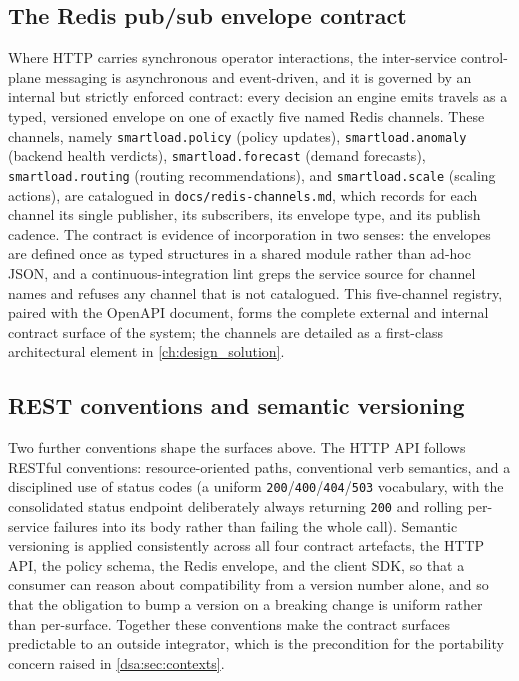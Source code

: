\subsection{The Redis pub/sub envelope contract}
\label{dsa:sec:standards-redis}

Where HTTP carries synchronous operator interactions, the inter-service control-plane
messaging is asynchronous and event-driven, and it is governed by an internal but
strictly enforced contract: every decision an engine emits travels as a typed,
versioned envelope on one of exactly five named Redis \cite{carlson2013redis}
channels. These channels, namely \texttt{smartload.policy} (policy updates),
\texttt{smartload.anomaly} (backend health verdicts), \texttt{smartload.forecast}
(demand forecasts), \texttt{smartload.routing} (routing recommendations), and
\texttt{smartload.scale} (scaling actions), are catalogued in
\texttt{docs/redis-channels.md}, which records for each channel its single publisher,
its subscribers, its envelope type, and its publish cadence. The contract is evidence
of incorporation in two senses: the envelopes are defined once as typed structures in
a shared module rather than ad-hoc JSON, and a continuous-integration lint greps the
service source for channel names and refuses any channel that is not catalogued. This
five-channel registry, paired with the OpenAPI document, forms the complete external
and internal contract surface of the system; the channels are detailed as a
first-class architectural element in \cref{ch:design_solution}.

\subsection{REST conventions and semantic versioning}
\label{dsa:sec:standards-rest}

Two further conventions shape the surfaces above. The HTTP API follows RESTful
conventions: resource-oriented paths, conventional verb semantics, and a
disciplined use of status codes (a uniform \texttt{200}/\texttt{400}/\texttt{404}/\texttt{503}
vocabulary, with the consolidated status endpoint deliberately always returning
\texttt{200} and rolling per-service failures into its body rather than failing the
whole call). Semantic versioning is applied consistently across all four contract
artefacts, the HTTP API, the policy schema, the Redis envelope, and the client SDK,
so that a consumer can reason about compatibility from a version number alone, and
so that the obligation to bump a version on a breaking change is uniform rather than
per-surface. Together these conventions make the contract surfaces predictable to an
outside integrator, which is the precondition for the portability concern raised in
\cref{dsa:sec:contexts}.

